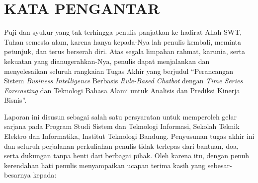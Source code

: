 \chapter*{KATA PENGANTAR}

Puji dan syukur yang tak terhingga penulis panjatkan ke hadirat Allah SWT, Tuhan semesta alam, karena hanya kepada-Nya lah penulis kembali, meminta petunjuk, dan terus berserah diri. Atas segala limpahan rahmat, karunia, serta kekuatan yang dianugerahkan-Nya, penulis dapat menjalankan dan menyelesaikan seluruh rangkaian Tugas Akhir yang berjudul ``Perancangan Sistem \textit{Business Intelligence} Berbasis \textit{Rule-Based Chatbot} dengan \textit{Time Series Forecasting} dan Teknologi Bahasa Alami untuk Analisis dan Prediksi Kinerja Bisnis''. 

Laporan ini disusun sebagai salah satu persyaratan untuk memperoleh gelar sarjana pada Program Studi Sistem dan Teknologi Informasi, Sekolah Teknik Elektro dan Informatika, Institut Teknologi Bandung. Penyusunan tugas akhir ini dan seluruh perjalanan perkuliahan penulis tidak terlepas dari bantuan, doa, serta dukungan tanpa henti dari berbagai pihak. Oleh karena itu, dengan penuh kerendahan hati penulis menyampaikan ucapan terima kasih yang sebesar-besarnya kepada:

